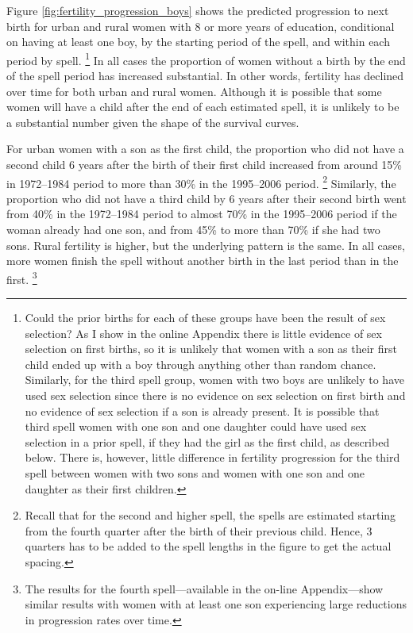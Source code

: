 \documentclass[12pt,letterpaper]{article}
\begin{document}
Figure \ref{fig:fertility_progression_boys} shows the predicted progression to
next birth for urban and rural women with 8 or more years of education, conditional on 
having at least one boy, by the starting period of the spell, and within each period by 
spell.%
\footnote{
Could the prior births for each of these groups have been the result of sex selection?
As I show in the online Appendix there is little evidence of sex selection on first births,
so it is unlikely that women with a son as their first child ended up with a 
boy through anything other than random chance.
Similarly, for the third spell group, women with two boys are unlikely to have used sex 
selection since there is no evidence on sex selection on first birth and no evidence of 
sex selection if a son is already present.
It is possible that third spell women with one son and one daughter could 
have used sex selection in a prior spell, if they had the girl as the first child, as
described below.
There is, however, little difference in fertility progression for the third spell between 
women with two sons and women with one son and one daughter as their first children.
}
In all cases the proportion of women without a birth by the end of the spell period has 
increased substantial.
In other words, fertility has declined over time for both urban and rural women.
Although it is possible that some women will have a child after the end
of each estimated spell, it is unlikely to be a substantial number given the shape
of the survival curves.

For urban women with a son as the first child, the proportion who did not have a second 
child 6 years after the birth of their first child increased from around 15\% in 
1972--1984 period to more than 30\% in the 1995--2006 period.%
\footnote{
Recall that for the second and higher spell, the spells are estimated starting from the 
fourth quarter after the birth of their previous child.
Hence, 3 quarters has to be added to the spell lengths in the figure to get the actual
spacing.
}
Similarly, the proportion who did not have a third child by 6 years after their second
birth went from 40\% in the 1972--1984 period to almost 70\% in the 1995--2006 period
if the woman already had one son, and from 45\% to more than 70\% if she had two sons.
Rural fertility is higher, but the underlying pattern is the same.
In all cases, more women finish the spell without another birth in the last period than 
in the first.%
\footnote{
The results for the fourth spell---available in the on-line Appendix---show similar 
results with women with at least one son experiencing large reductions in progression
rates over time.
}
\end{document}
